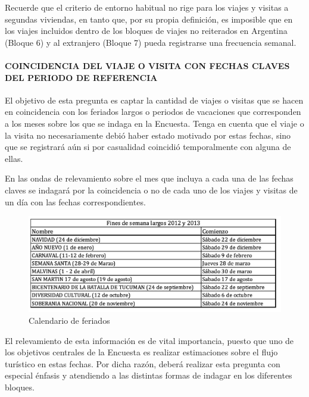 \documentclass[
  openany]{book}
\begin{document}
Recuerde que el criterio de entorno habitual no rige para los viajes y visitas a segundas viviendas, en tanto que, por su propia definición, es imposible que en los viajes incluidos dentro de los bloques de viajes no reiterados en Argentina (Bloque 6) y al extranjero (Bloque 7) pueda registrarse una frecuencia semanal.

\hypertarget{coincidencia-del-viaje-o-visita-con-fechas-claves-del-periodo-de-referencia}{%
\paragraph{\texorpdfstring{\textbf{COINCIDENCIA DEL VIAJE O VISITA CON FECHAS CLAVES DEL PERIODO DE REFERENCIA}}{COINCIDENCIA DEL VIAJE O VISITA CON FECHAS CLAVES DEL PERIODO DE REFERENCIA}}\label{coincidencia-del-viaje-o-visita-con-fechas-claves-del-periodo-de-referencia}}

El objetivo de esta pregunta es captar la cantidad de viajes o visitas que se hacen en coincidencia con los feriados largos o periodos de vacaciones que corresponden a los meses sobre los que se indaga en la Encuesta. Tenga en cuenta que el viaje o la visita no necesariamente debió haber estado motivado por estas fechas, sino que se registrará aún si por casualidad coincidió temporalmente con alguna de ellas.

En las ondas de relevamiento sobre el mes que incluya a cada una de las fechas claves se indagará por la coincidencia o no de cada uno de los viajes y visitas de un día con las fechas correspondientes.

\begin{figure}

{\centering \includegraphics[width=1\linewidth]{imagenes/figura6-89} 

}

\caption{Calendario de feriados}\label{fig:calen}
\end{figure}

El relevamiento de esta información es de vital importancia, puesto que uno de los objetivos centrales de la Encuesta es realizar estimaciones sobre el flujo turístico en estas fechas. Por dicha razón, deberá realizar esta pregunta con especial énfasis y atendiendo a las distintas formas de indagar en los diferentes bloques.
\end{document}
